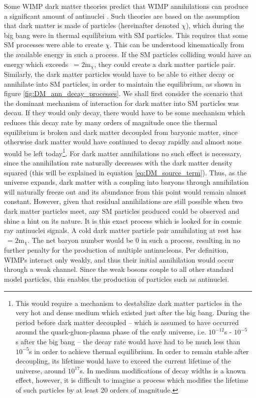 Some WIMP dark matter theories predict that WIMP annihilations can produce a significant amount of antinuclei \cite{}. Such theories are based on the assumption that dark matter is made of particles (hereinafter denoted $\chi$), which during the big bang were in thermal equilibrium with SM particles. This requires that some SM processes were able to create $\chi$. This can be understood kinematically from the available energy in such a process. If the SM particles colliding would have an energy which exceeds \Vs\ = $2\mathrm{m}_\chi$, they could create a dark matter particle pair. Similarly, the dark matter particles would have to be able to either decay or annihilate into SM particles, in order to maintain the equilibrium, as shown in figure \ref{fig:DM_ann_decay_processes}. We shall first consider the scenario that the dominant mechanism of interaction for dark matter into SM particles was decau. If they would only decay, there would have to be some mechanism which reduces this decay rate by many orders of magnitude once the thermal equilibrium is broken and dark matter decoupled from baryonic matter, since otherwise dark matter would have continued to decay rapidly and almost none would be left today\footnote{This would require a mechanism to destabilize dark matter particles in the very hot and dense medium which existed just after the big bang. During the period before dark matter decoupled -- which is assumed to have occurred around the quark-gluon-plasma phase of the early universe, i.e. $10^{-12}$s - $10^{-5}$ s after the big bang -- the decay rate would have had to be much less than $10^{-5}$s in order to achieve thermal equilibrium. In order to remain stable after decoupling, its lifetime would have to exceed the current lifetime of the universe, around $10^{17}$s. In medium modifications of decay widths is a known effect\cite{}, however, it is difficult to imagine a process which modifies the lifetime of such particles by at least 20 orders of magnitude.}. For dark matter annihilations no such effect is necessary, since the annihilation rate naturally decreases with the dark matter density squared (this will be explained in equation \ref{eq:DM_source_term}). Thus, as the universe expands, dark matter with a coupling into baryons through annihilation will naturally freeze out and its abundance from this point would remain almost constant. However, given that residual annihilations are still possible when two dark matter particles meet, any SM particles produced could be observed and shine a hint on its nature. It is this exact process which is looked for in cosmic ray antinuclei signals. A cold dark matter particle pair annihilating at rest has \Vs\ = $2\mathrm{m}_\chi$. The net baryon number would be 0 in such a process, resulting in no further penalty for the production of multiple antinucleons. Per definition, WIMPs interact only weakly, and thus their initial annihilation would occur through a weak channel. Since the weak bosons couple to all other standard model particles, this enables the production of particles such as antinuclei. \\



